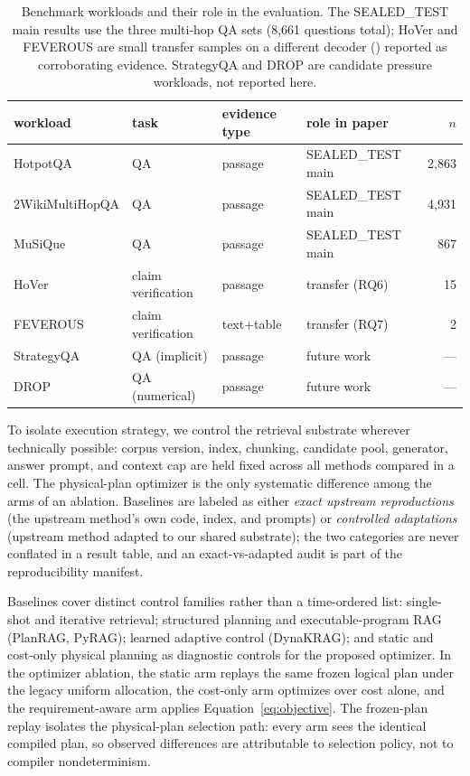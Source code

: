 \begin{table}[t]
\centering
\caption{Benchmark workloads and their role in the evaluation. The
SEALED\_TEST main results use the three multi-hop QA sets (8,661 questions
total); HoVer and FEVEROUS are small transfer samples on a different decoder
() reported as corroborating evidence. StrategyQA and DROP
are candidate pressure workloads, not reported here.}
\label{tab:datasets}
\small
\begin{tabular}{llllr}
\toprule
workload & task & evidence type & role in paper & $n$ \\
\midrule
HotpotQA & QA & passage & SEALED\_TEST main & 2,863 \\
2WikiMultiHopQA & QA & passage & SEALED\_TEST main & 4,931 \\
MuSiQue & QA & passage & SEALED\_TEST main & 867 \\
HoVer & claim verification & passage & transfer (RQ6) & 15 \\
FEVEROUS & claim verification & text+table & transfer (RQ7) & 2 \\
StrategyQA & QA (implicit) & passage & future work & --- \\
DROP & QA (numerical) & passage & future work & --- \\
\bottomrule
\end{tabular}
\end{table}

To isolate execution strategy, we control the retrieval substrate wherever
technically possible: corpus version, index, chunking, candidate pool,
generator, answer prompt, and context cap are held fixed across all methods
compared in a cell. The physical-plan optimizer is the only systematic
difference among the arms of an ablation. Baselines are labeled as either
\emph{exact upstream reproductions} (the upstream method's own code, index, and
prompts) or \emph{controlled adaptations} (upstream method adapted to our shared
substrate); the two categories are never conflated in a result table, and an
exact-vs-adapted audit is part of the reproducibility manifest.

Baselines cover distinct control families rather than a time-ordered list:
single-shot and iterative retrieval; structured planning and executable-program
RAG (PlanRAG, PyRAG); learned adaptive control (DynaKRAG); and static and
cost-only physical planning as diagnostic controls for the proposed optimizer.
In the optimizer ablation, the static arm replays the same frozen logical plan
under the legacy uniform allocation, the cost-only arm optimizes over cost
alone, and the requirement-aware arm applies Equation~\ref{eq:objective}. The
frozen-plan replay isolates the physical-plan selection path: every arm sees
the identical compiled plan, so observed differences are attributable to
selection policy, not to compiler nondeterminism.

